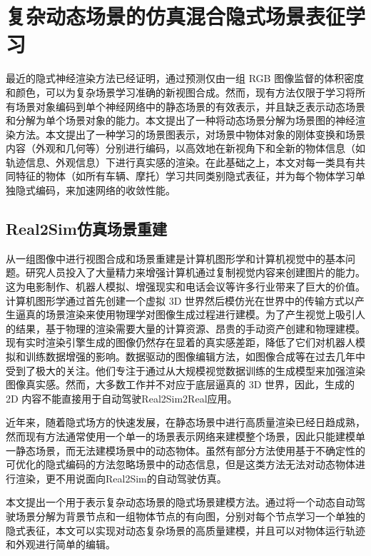 \chapter{复杂动态场景的仿真混合隐式场景表征学习}
\label{chapter: scene-graph}
最近的隐式神经渲染方法已经证明，通过预测仅由一组 RGB 图像监督的体积密度和颜色，可以为复杂场景学习准确的新视图合成。然而，现有方法仅限于学习将所有场景对象编码到单个神经网络中的静态场景的有效表示，并且缺乏表示动态场景和分解为单个场景对象的能力。本文提出了一种将动态场景分解为场景图的神经渲染方法。本文提出了一种学习的场景图表示，对场景中物体对象的刚体变换和场景内容（外观和几何等）分别进行编码，以高效地在新视角下和全新的物体信息（如轨迹信息、外观信息）下进行真实感的渲染。在此基础之上，本文对每一类具有共同特征的物体（如所有车辆、摩托）学习共同类别隐式表征，并为每个物体学习单独隐式编码，来加速网络的收敛性能。

\section{Real2Sim仿真场景重建}

从一组图像中进行视图合成和场景重建是计算机图形学和计算机视觉中的基本问题。研究人员投入了大量精力来增强计算机通过复制视觉内容来创建图片的能力。这为电影制作、机器人模拟、增强现实和电话会议等许多行业带来了巨大的价值。计算机图形学通过首先创建一个虚拟 3D 世界然后模仿光在世界中的传输方式以产生逼真的场景渲染来使用物理学对图像生成过程进行建模。为了产生视觉上吸引人的结果，基于物理的渲染需要大量的计算资源、昂贵的手动资产创建和物理建模。现有实时渲染引擎生成的图像仍然存在显着的真实感差距，降低了它们对机器人模拟和训练数据增强的影响。数据驱动的图像编辑方法，如图像合成等在过去几年中受到了极大的关注。他们专注于通过从大规模视觉数据训练的生成模型来加强渲染图像真实感。然而，大多数工作并不对应于底层逼真的 3D 世界，因此，生成的 2D 内容不能直接用于自动驾驶Real2Sim2Real应用。

近年来，随着隐式场方\cite{mildenhall_nerf_2020, barron_mip-nerf_2022, muller_instant_2022}的快速发展，在静态场景中进行高质量渲染已经日趋成熟，然而现有方法通常使用一个单一的场景表示网络来建模整个场景，因此只能建模单一静态场景，而无法建模场景中的动态物体。虽然有部分方法使用基于不确定性的可优化的隐式编码的方法忽略场景中的动态信息\cite{martin-brualla_nerf_2021}，但是这类方法无法对动态物体进行渲染，更不用说面向Real2Sim的自动驾驶仿真。

本文提出一个用于表示复杂动态场景的隐式场景建模方法。通过将一个动态自动驾驶场景分解为背景节点和一组物体节点的有向图，分别对每个节点学习一个单独的隐式表征，本文可以实现对动态复杂场景的高质量建模，并且可以对物体运行轨迹和外观进行简单的编辑。

